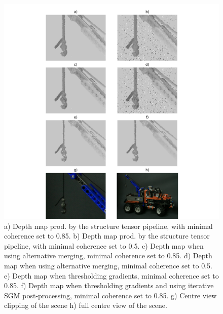 \documentclass  [
  paper    = a4,
  BCOR     = 10mm,
  twoside,
  fontsize = 12pt,
  fleqn,
  toc      = bibnumbered,
  toc      = listofnumbered,
  numbers  = noendperiod,
  headings = normal,
  listof   = leveldown,
  version  = 3.03
]                                       {scrreprt}
\begin{document}
\begin{figure}
	\centering
	\includegraphics[width=1\linewidth]{images/truck_realdata_small}
	\caption[Truck clipping with iterative SGM]{a) Depth map prod. by the structure tensor pipeline, with minimal coherence set to 0.85. b) Depth map prod. by the structure tensor pipeline, with minimal coherence set to 0.5. c) Depth map when using alternative merging, minimal coherence set to 0.85. d) Depth map when using alternative merging, minimal coherence set to 0.5. e) Depth map when thresholding gradients, minimal coherence set to 0.85. f) Depth map when thresholding gradients and using iterative SGM post-processing, minimal coherence set to 0.85.  g) Centre view clipping of the scene h) full centre view of the scene.}
	\label{fig:truckrealdatasmall}
\end{figure}
\end{document}
